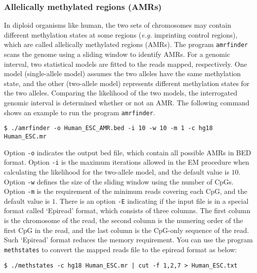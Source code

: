 \documentclass[10pt]{article}
\newcommand{\prog}[1]{\texttt{#1}}
\newcommand{\op}[1]{\texttt{#1}}
\begin{document}
\subsubsection{Allelically methylated regions (AMRs)}
In diploid organisms like human, the two sets of chromosomes may contain different methylation states at some regions ({\em e.g.} imprinting control regions), which are called allelically methylated regions (AMRs). The program \prog{amrfinder} scans the genome using a sliding window to identify AMRs. For a genomic interval, two statistical models are fitted to the reads mapped, respectively. One model (single-allele model) assumes the two alleles have the same methylation state, and the other (two-allele model) represents different methylation states for the two alleles. Comparing the likelihood of the two models, the interrogated genomic interval is determined whether or not an AMR. The following command shows an example to run the program \prog{amrfinder}.
\begin{verbatim}
$ ./amrfinder -o Human_ESC_AMR.bed -i 10 -w 10 -m 1 -c hg18 Human_ESC.mr
\end{verbatim}
Option \op{-o} indicates the output bed file, which contain all possible AMRs in BED format. Option \op{-i} is the maximum iterations allowed in the EM procedure when calculating the likelihood for the two-allele model, and the default value is $10$. Option \op{-w} defines the size of the sliding window using the number of CpGs. Option \op{-m} is the requirement of the minimum reads covering each CpG, and the default value is $1$. There is an option \op{-E} indicating if the input file is in a special format called `Epiread' format, which consists of three columns. The first column is the chromosome of the read, the second column is the numering order of the first CpG in the read, and the last column is the CpG-only sequence of the read. Such `Epiread' format reduces the memory requirement. You can use the program \prog{methstates} to convert the mapped reads file to the epiread format as below:
\begin{verbatim}
$ ./methstates -c hg18 Human_ESC.mr | cut -f 1,2,7 > Human_ESC.txt
\end{verbatim}
\end{document}
